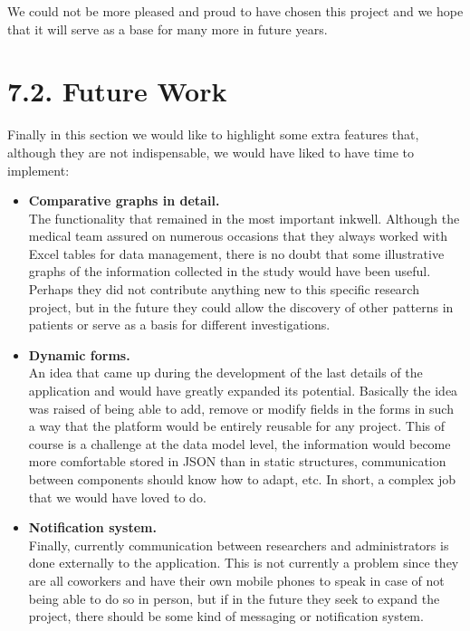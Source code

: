     We could not be more pleased and proud to have chosen this project and we hope that it will serve as a base for many more in future years. \newpage
    
 \section*{7.2. Future Work}
      
Finally in this section we would like to highlight some extra features that, although they are not indispensable, we would have liked to have time to implement:
 \newline
 
 \begin{itemize}
  \item\textbf{Comparative graphs in detail.} \\
The functionality that remained in the most important inkwell. Although the medical team assured on numerous occasions that they always worked with Excel tables for data management, there is no doubt that some illustrative graphs of the information collected in the study would have been useful. Perhaps they did not contribute anything new to this specific research project, but in the future they could allow the discovery of other patterns in patients or serve as a basis for different investigations. \\
  
  \item\textbf{Dynamic forms.} \\
  An idea that came up during the development of the last details of the application and would have greatly expanded its potential. Basically the idea was raised of being able to add, remove or modify fields in the forms in such a way that the platform would be entirely reusable for any project. This of course is a challenge at the data model level, the information would become more comfortable stored in JSON than in static structures, communication between components should know how to adapt, etc. In short, a complex job that we would have loved to do. \\
  
  \item\textbf{Notification system.} \\
  Finally, currently communication between researchers and administrators is done externally to the application. This is not currently a problem since they are all coworkers and have their own mobile phones to speak in case of not being able to do so in person, but if in the future they seek to expand the project, there should be some kind of messaging or notification system.
  \newline
  

\end{itemize}
